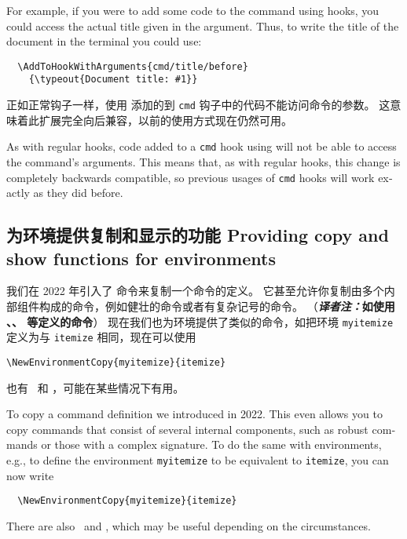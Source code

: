\documentclass{ltnews}
\providecommand\hook[1]{\texttt{#1}}
\providecommand\env[1]{\texttt{#1}}
\providecommand\env[1]{\texttt{#1}}
\newcommand{\itransnote}[1]{（{\bfseries \textit{译者注：}#1}）}
\begin{document}
\begin{english}
For example, if you were to add some code to the  command
using hooks, you could access the actual title given in the argument.
Thus, to write the title of the document in the terminal you
could use:
\begin{verbatim}
  \AddToHookWithArguments{cmd/title/before}
    {\typeout{Document title: #1}}
\end{verbatim}
\end{english}

正如正常钩子一样，使用  添加的到 \hook{cmd} 钩子中的代码不能访问命令的参数。
这意味着此扩展完全向后兼容，以前的使用方式现在仍然可用。

\begin{english}
As with regular hooks, code added to a \hook{cmd} hook using
 will not be able to access the command's arguments.  This
means that, as with regular hooks, this change is completely backwards
compatible, so previous usages of \hook{cmd} hooks will work exactly as
they did before.
\end{english}

\subsection{为环境提供复制和显示的功能 Providing copy and show functions for environments}

我们在 2022 年引入了  命令来复制一个命令的定义。
它甚至允许你复制由多个内部组件构成的命令，例如健壮的命令或者有复杂记号的命令。
\itransnote{如使用 、、\cs{NewDocumentCommand}
等定义的命令}
现在我们也为环境提供了类似的命令，如把环境 \env{myitemize} 定义为与 \env{itemize} 相同，现在可以使用
\begin{verbatim}
\NewEnvironmentCopy{myitemize}{itemize}
\end{verbatim}
也有 \ 和 ，可能在某些情况下有用。

\begin{english}
To copy a command definition we introduced  in
2022.  This even allows you to copy commands that consist of several internal
components, such as robust commands or those with a complex signature.
To do the same with environments, e.g., to define the environment
\env{myitemize} to be equivalent to \env{itemize}, you can now write
\begin{verbatim}
  \NewEnvironmentCopy{myitemize}{itemize}
\end{verbatim}
There are also \ and , which may be useful
depending on the circumstances.
\end{english}
\end{document}

